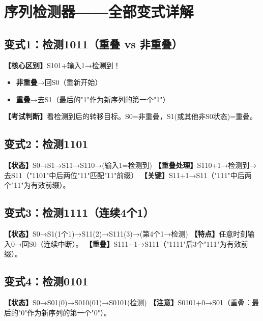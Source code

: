 \chapter{序列检测器——全部变式详解}

\section{变式1：检测1011（重叠 vs 非重叠）}

\begin{detailbox}[完整教学]
\textbf{【核心区别】}S101+输入1→检测到！
\begin{itemize}
  \item \textbf{非重叠}→回S0（重新开始）
  \item \textbf{重叠}→去S1（最后的"1"作为新序列的第一个"1"）
\end{itemize}
\textbf{【考试判断】}看检测到后的转移目标。S0=非重叠，S1(或其他非S0状态)=重叠。
\end{detailbox}


\section{变式2：检测1101}

\begin{detailbox}[完整教学]
\textbf{【状态】}S0→S1→S11→S110→(输入1=检测到)
\textbf{【重叠处理】}S110+1→检测到→去S11（"1101"中后两位"11"匹配"11"前缀）
\textbf{【关键】}S11+1→S11（"111"中后两个"11"为有效前缀）。
\end{detailbox}


\section{变式3：检测1111（连续4个1）}

\begin{detailbox}[完整教学]
\textbf{【状态】}S0→S1(1个1)→S11(2)→S111(3)→(第4个1→检测)
\textbf{【特点】}任意时刻输入0→回S0（连续中断）。
\textbf{【重叠】}S111+1→S111（"1111"后3个"111"为有效前缀）。
\end{detailbox}


\section{变式4：检测0101}

\begin{detailbox}[完整教学]
\textbf{【状态】}S0→S01(0)→S010(01)→S0101(检测)
\textbf{【注意】}S0101+0→S01（重叠：最后的"0"作为新序列的第一个"0"）。
\end{detailbox}


